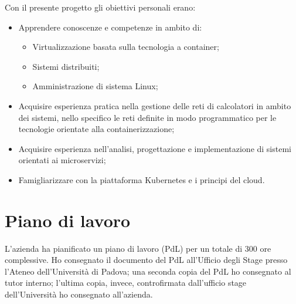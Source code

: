 Con il presente progetto gli obiettivi personali erano:

\begin{itemize}
	\item Apprendere conoscenze e competenze in ambito di:
		\begin{itemize}
			\item Virtualizzazione basata sulla tecnologia a container; 
			\item Sistemi distribuiti;
			\item Amministrazione di sistema Linux;
	    \end{itemize}
	\item Acquisire esperienza pratica nella gestione delle reti di calcolatori in ambito dei sistemi, nello specifico le reti definite in modo programmatico per le tecnologie orientate alla containerizzazione; 
	\item Acquisire esperienza nell'analisi, progettazione e implementazione di sistemi orientati ai microservizi;
	\item Famigliarizzare con la piattaforma Kubernetes e i principi del \gls{cloud}.
\end{itemize} 

\section{Piano di lavoro}
\label{sec:piano-di-lavoro}
L'azienda ha pianificato un piano di lavoro (PdL) per un totale di 300 ore complessive. 
Ho consegnato il documento del PdL all'Ufficio degli Stage presso l'Ateneo dell'Università di Padova; una seconda copia del PdL ho consegnato al tutor interno; l'ultima copia, invece, 
controfirmata dall'ufficio stage dell'Università ho consegnato all'azienda.

